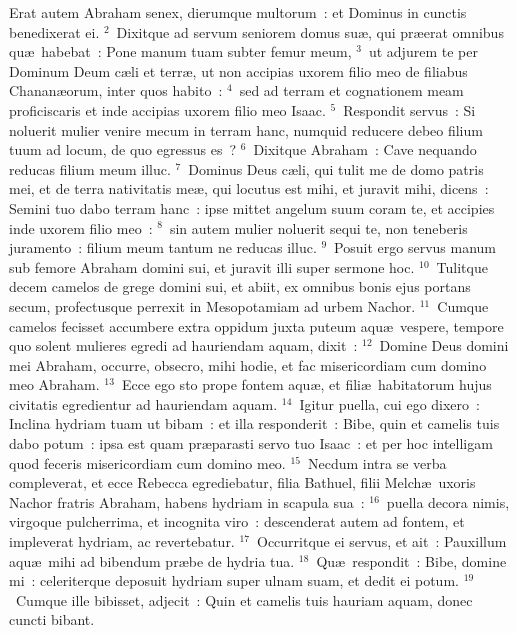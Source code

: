 \lettrine[lines=3,image=true,loversize=0.05,lraise=-0.03]{E}{}rat autem Abraham senex, dierumque multorum~: et Dominus in cunctis benedixerat ei.
${}^{2}$~Dixitque ad servum seniorem domus su\ae , qui pr\ae erat omnibus qu\ae\ habebat~: Pone manum tuam subter femur meum,
${}^{3}$~ut adjurem te per Dominum Deum c\ae li et terr\ae , ut non accipias uxorem filio meo de filiabus Chanan\ae orum, inter quos habito~:
${}^{4}$~sed ad terram et cognationem meam proficiscaris et inde accipias uxorem filio meo Isaac.
${}^{5}$~Respondit servus~: Si noluerit mulier venire mecum in terram hanc, numquid reducere debeo filium tuum ad locum, de quo egressus es~?
${}^{6}$~Dixitque Abraham~: Cave nequando reducas filium meum illuc.
${}^{7}$~Dominus Deus c\ae li, qui tulit me de domo patris mei, et de terra nativitatis me\ae , qui locutus est mihi, et juravit mihi, dicens~: Semini tuo dabo terram hanc~: ipse mittet angelum suum coram te, et accipies inde uxorem filio meo~:
${}^{8}$~sin autem mulier noluerit sequi te, non teneberis juramento~: filium meum tantum ne reducas illuc.
${}^{9}$~Posuit ergo servus manum sub femore Abraham domini sui, et juravit illi super sermone hoc.
${}^{10}$~Tulitque decem camelos de grege domini sui, et abiit, ex omnibus bonis ejus portans secum, profectusque perrexit in Mesopotamiam ad urbem Nachor.
${}^{11}$~Cumque camelos fecisset accumbere extra oppidum juxta puteum aqu\ae\ vespere, tempore quo solent mulieres egredi ad hauriendam aquam, dixit~:
${}^{12}$~Domine Deus domini mei Abraham, occurre, obsecro, mihi hodie, et fac misericordiam cum domino meo Abraham.
${}^{13}$~Ecce ego sto prope fontem aqu\ae , et fili\ae\ habitatorum hujus civitatis egredientur ad hauriendam aquam.
${}^{14}$~Igitur puella, cui ego dixero~: Inclina hydriam tuam ut bibam~: et illa responderit~: Bibe, quin et camelis tuis dabo potum~: ipsa est quam pr\ae parasti servo tuo Isaac~: et per hoc intelligam quod feceris misericordiam cum domino meo.
${}^{15}$~Necdum intra se verba compleverat, et ecce Rebecca egrediebatur, filia Bathuel, filii Melch\ae\ uxoris Nachor fratris Abraham, habens hydriam in scapula sua~:
${}^{16}$~puella decora nimis, virgoque pulcherrima, et incognita viro~: descenderat autem ad fontem, et impleverat hydriam, ac revertebatur.
${}^{17}$~Occurritque ei servus, et ait~: Pauxillum aqu\ae\ mihi ad bibendum pr\ae be de hydria tua.
${}^{18}$~Qu\ae\ respondit~: Bibe, domine mi~: celeriterque deposuit hydriam super ulnam suam, et dedit ei potum.
${}^{19}$~Cumque ille bibisset, adjecit~: Quin et camelis tuis hauriam aquam, donec cuncti bibant.

